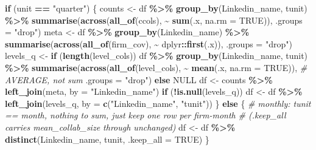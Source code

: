 \documentclass[
]{article}
\newenvironment{Shaded}{\begin{snugshade}}{\end{snugshade}}
\newcommand{\AttributeTok}[1]{\textcolor[rgb]{0.13,0.29,0.53}{#1}}
\newcommand{\CommentTok}[1]{\textcolor[rgb]{0.56,0.35,0.01}{\textit{#1}}}
\newcommand{\ConstantTok}[1]{\textcolor[rgb]{0.56,0.35,0.01}{#1}}
\newcommand{\ControlFlowTok}[1]{\textcolor[rgb]{0.13,0.29,0.53}{\textbf{#1}}}
\newcommand{\FunctionTok}[1]{\textcolor[rgb]{0.13,0.29,0.53}{\textbf{#1}}}
\newcommand{\NormalTok}[1]{#1}
\newcommand{\OtherTok}[1]{\textcolor[rgb]{0.56,0.35,0.01}{#1}}
\newcommand{\SpecialCharTok}[1]{\textcolor[rgb]{0.81,0.36,0.00}{\textbf{#1}}}
\newcommand{\StringTok}[1]{\textcolor[rgb]{0.31,0.60,0.02}{#1}}
\begin{document}
\begin{Shaded}
\begin{Highlighting}[]
  \ControlFlowTok{if}\NormalTok{ (unit }\SpecialCharTok{==} \StringTok{"quarter"}\NormalTok{) \{}
\NormalTok{    counts }\OtherTok{\textless{}{-}}\NormalTok{ df }\SpecialCharTok{\%\textgreater{}\%}
      \FunctionTok{group\_by}\NormalTok{(Linkedin\_name, tunit) }\SpecialCharTok{\%\textgreater{}\%}
      \FunctionTok{summarise}\NormalTok{(}\FunctionTok{across}\NormalTok{(}\FunctionTok{all\_of}\NormalTok{(ccols), }\SpecialCharTok{\textasciitilde{}} \FunctionTok{sum}\NormalTok{(.x, }\AttributeTok{na.rm =} \ConstantTok{TRUE}\NormalTok{)),}
                \AttributeTok{.groups =} \StringTok{"drop"}\NormalTok{)}
\NormalTok{    meta }\OtherTok{\textless{}{-}}\NormalTok{ df }\SpecialCharTok{\%\textgreater{}\%}
      \FunctionTok{group\_by}\NormalTok{(Linkedin\_name) }\SpecialCharTok{\%\textgreater{}\%}
      \FunctionTok{summarise}\NormalTok{(}\FunctionTok{across}\NormalTok{(}\FunctionTok{all\_of}\NormalTok{(firm\_cov), }\SpecialCharTok{\textasciitilde{}}\NormalTok{ dplyr}\SpecialCharTok{::}\FunctionTok{first}\NormalTok{(.x)),}
                \AttributeTok{.groups =} \StringTok{"drop"}\NormalTok{)}
\NormalTok{    levels\_q }\OtherTok{\textless{}{-}} \ControlFlowTok{if}\NormalTok{ (}\FunctionTok{length}\NormalTok{(level\_cols)) df }\SpecialCharTok{\%\textgreater{}\%}
      \FunctionTok{group\_by}\NormalTok{(Linkedin\_name, tunit) }\SpecialCharTok{\%\textgreater{}\%}
      \FunctionTok{summarise}\NormalTok{(}\FunctionTok{across}\NormalTok{(}\FunctionTok{all\_of}\NormalTok{(level\_cols), }\SpecialCharTok{\textasciitilde{}} \FunctionTok{mean}\NormalTok{(.x, }\AttributeTok{na.rm =} \ConstantTok{TRUE}\NormalTok{)),  }\CommentTok{\# AVERAGE, not sum}
                \AttributeTok{.groups =} \StringTok{"drop"}\NormalTok{) }\ControlFlowTok{else} \ConstantTok{NULL}
\NormalTok{    df }\OtherTok{\textless{}{-}}\NormalTok{ counts }\SpecialCharTok{\%\textgreater{}\%} \FunctionTok{left\_join}\NormalTok{(meta, }\AttributeTok{by =} \StringTok{"Linkedin\_name"}\NormalTok{)}
    \ControlFlowTok{if}\NormalTok{ (}\SpecialCharTok{!}\FunctionTok{is.null}\NormalTok{(levels\_q)) df }\OtherTok{\textless{}{-}}\NormalTok{ df }\SpecialCharTok{\%\textgreater{}\%} \FunctionTok{left\_join}\NormalTok{(levels\_q, }\AttributeTok{by =} \FunctionTok{c}\NormalTok{(}\StringTok{"Linkedin\_name"}\NormalTok{, }\StringTok{"tunit"}\NormalTok{))}
\NormalTok{  \} }\ControlFlowTok{else}\NormalTok{ \{}
    \CommentTok{\# monthly: tunit == month, nothing to sum, just keep one row per firm{-}month}
    \CommentTok{\# (.keep\_all carries mean\_collab\_size through unchanged)}
\NormalTok{    df }\OtherTok{\textless{}{-}}\NormalTok{ df }\SpecialCharTok{\%\textgreater{}\%} \FunctionTok{distinct}\NormalTok{(Linkedin\_name, tunit, }\AttributeTok{.keep\_all =} \ConstantTok{TRUE}\NormalTok{)}
\NormalTok{  \}}


\end{Highlighting}
\end{Shaded}
\end{document}
